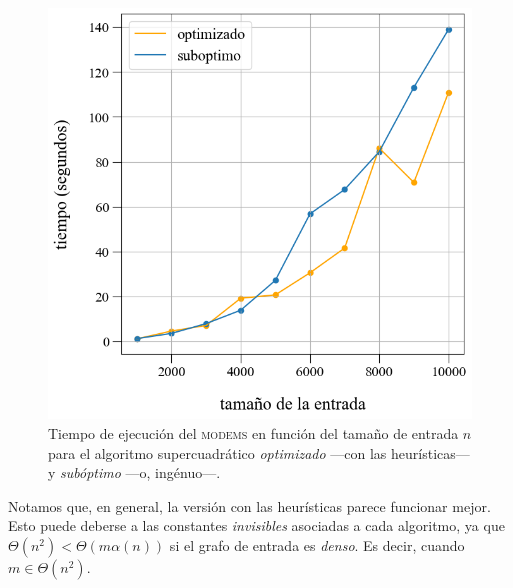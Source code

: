 \vspace{0.5em}
\begin{figure}[!htbp]
    \includegraphics[scale=0.4, clip]{./files/src/.media/comparacion_DSU.png}
    \caption{Tiempo de ejecución del \textsc{modems} en función del tamaño de entrada $n$ para el algoritmo supercuadrático \textit{optimizado} ---con las heurísticas--- y \textit{subóptimo} ---o, ingénuo---.}\label{fig2}
\end{figure}

Notamos que, en general, la versión con las heurísticas parece funcionar mejor. Esto puede deberse a las constantes \textit{invisibles} asociadas a cada algoritmo, ya que $\Theta(n^2) < \Theta(m\alpha(n))$ si el grafo de entrada es \textit{denso}. Es decir, cuando $m \in \Theta(n^2)$. 
